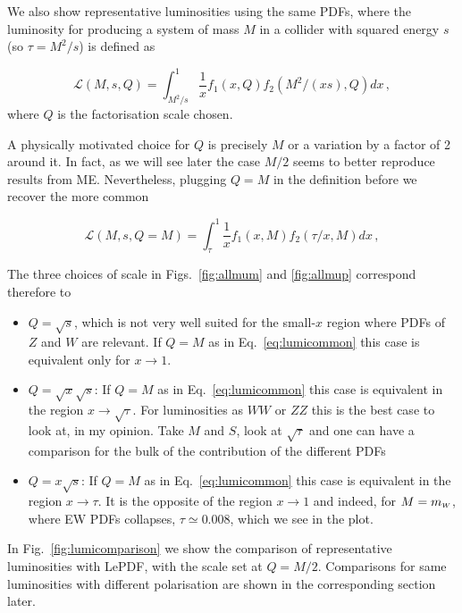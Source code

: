 \documentclass[a4paper,11pt]{article}
\begin{document}
We also show representative luminosities using the same PDFs, where the luminosity for producing a system of mass $M$ in a collider with squared energy $s$ (so $\tau=M^2/s$) is defined as

\begin{equation}
\mathcal L(M,s,Q)=\int_{M^2/s}^1 \frac{1}{x} f_1(x,Q) f_2(M^2/(x s),Q) dx\, ,
\end{equation}
where $Q$ is the factorisation scale chosen.

A physically motivated choice for $Q$ is precisely $M$ or a variation by a factor of 2 around it. In fact, as we will see later the case $M/2$ seems to better reproduce results from ME. Nevertheless, plugging $Q=M$ in the definition before we recover the more common

\begin{equation}
\mathcal L(M,s,Q=M)=\int_{\tau}^1 \frac{1}{x} f_1(x,M) f_2(\tau/x,M) dx\, , \label{eq:lumicommon}
\end{equation}

The three choices of scale in Figs.~\ref{fig:allmum} and \ref{fig:allmup} correspond therefore to 

\begin{itemize}
\item $Q=\sqrt{s}$, which is not very well suited for the small-$x$ region where PDFs of $Z$ and $W$ are relevant. If $Q=M$ as in Eq.~\eqref{eq:lumicommon} this case is equivalent only for $x\to 1$.
\item$Q=\sqrt{x} \sqrt{s}$: If $Q=M$ as in Eq.~\eqref{eq:lumicommon} this case is equivalent in the region $x\to \sqrt{\tau}$. For luminosities as $WW$ or $ZZ$ this is the best case to look at, in my opinion. Take $M$ and $S$, look at $\sqrt{\tau}$ and one can have a comparison for the bulk of the contribution of the different PDFs
\item $Q=x \sqrt{s}$: If $Q=M$ as in Eq.~\eqref{eq:lumicommon} this case is equivalent in the region $x \to \tau$. It is the opposite of the region $x\to 1$ and indeed, for $M=m_{\scriptscriptstyle W}$, where EW PDFs collapses, $\tau \simeq 0.008$, which we see in the plot.    
\end{itemize}


In Fig.~\ref{fig:lumicomparison} we show the comparison of representative luminosities with {\small \sc LePDF}, with the scale set at $Q=M/2$.
Comparisons for same luminosities with different polarisation are shown in the corresponding section later.


\end{document}
